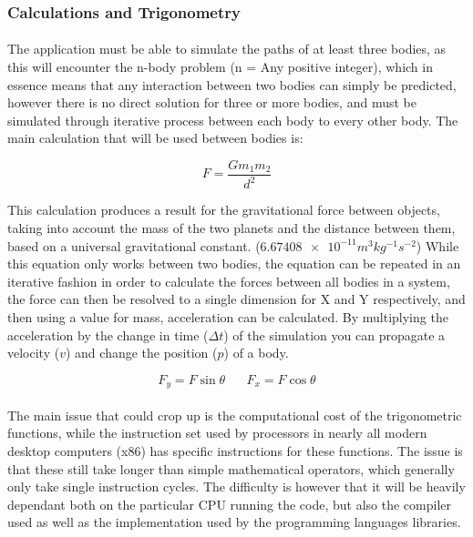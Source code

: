 \subsubsection{Calculations and Trigonometry}
\paragraph{}
The application must be able to simulate the paths of at least three bodies, as this will encounter the n-body problem (n = Any positive integer), which in essence means that any interaction between two bodies can simply be predicted, however there is no direct solution for three or more bodies, and must be simulated through iterative process between each body to every other body.
The main calculation that will be used between bodies is:

$$F=\frac{Gm_1m_2}{d^2}$$

This calculation produces a result for the gravitational force between objects, taking into account the mass of the two planets and the distance between them, based on a universal gravitational constant. ($\num{6.67408e-11} m^{3} kg^{-1} s^{-2}$) 
While this equation only works between two bodies, the equation can be repeated in an iterative fashion in order to calculate the forces between all bodies in a system, the force can then be resolved to a single dimension for X and Y respectively, and then using a value for mass, acceleration can be calculated. By multiplying the acceleration by the change in time ($\Delta t$) of the simulation you can propagate a velocity ($v$) and change the position ($p$) of a body.

$$F_y=F\sin{\theta} \hspace{20pt} F_x=F\cos{\theta}$$

\paragraph{}
The main issue that could crop up is the computational cost of the trigonometric functions, while the instruction set used by processors in nearly all modern desktop computers (x86) has specific instructions for these functions.
The issue is that these still take longer than simple mathematical operators, which generally only take single instruction cycles. The difficulty is however that it will be heavily dependant both on the particular CPU running the code, but also the compiler used as well as the implementation used by the programming languages libraries.

